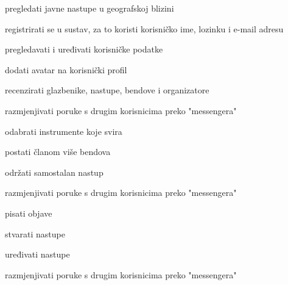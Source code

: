 			
			\begin{packed_enum}
			
			
			\item  {}
			
			\begin{packed_enum}
				\item pregledati javne nastupe u geografskoj blizini
				\item registrirati se u sustav, za to koristi korisničko ime, lozinku i e-mail adresu
			
			\end{packed_enum}
		
		\item  {}
		
		\begin{packed_enum}
			
			\item pregledavati i uređivati korisničke podatke
			\item dodati avatar na korisnički profil
			\item recenzirati glazbenike, nastupe, bendove i organizatore
			\item razmjenjivati poruke s drugim korisnicima preko "messengera"
			
		\end{packed_enum}
	
	

\item  {}

\begin{packed_enum}
	
	\item odabrati instrumente koje svira
	\item postati članom više bendova
	\item održati samostalan nastup
	\item razmjenjivati poruke s drugim korisnicima preko "messengera"
	\item pisati objave
\end{packed_enum}

\item  {}

\begin{packed_enum}
	
	\item stvarati nastupe
	\item uređivati nastupe
	\item razmjenjivati poruke s drugim korisnicima preko "messengera"
\end{packed_enum}


\end{packed_enum}
